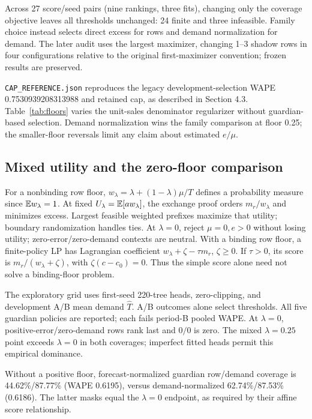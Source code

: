 Across 27 score/seed pairs (nine rankings, three fits), changing only the coverage objective leaves all thresholds unchanged: 24 finite and three infeasible. Family choice instead selects direct excess for rows and demand normalization for demand. The later audit uses the largest maximizer, changing 1--3 shadow rows in four configurations relative to the original first-maximizer convention; frozen results are preserved.

\texttt{CAP\_REFERENCE.json} reproduces the legacy development-selection WAPE 0.7530939208313988 and retained cap, as described in Section 4.3. Table~\ref{tab:floors} varies the unit-sales denominator regularizer without guardian-based selection. Demand normalization wins the family comparison at floor 0.25; the smaller-floor reversals limit any claim about estimated $e/\mu$.


\subsection{Mixed utility and the zero-floor comparison}
\label{app:mixed}
For a nonbinding row floor, $w_\lambda=\lambda+(1-\lambda)\mu/T$ defines a probability measure since $\mathbb{E} w_\lambda=1$. At fixed $U_\lambda=\mathbb{E}[aw_\lambda]$, the exchange proof orders $m_r/w_\lambda$ and minimizes excess. Largest feasible weighted prefixes maximize that utility; boundary randomization handles ties. At $\lambda=0$, reject $\mu=0,e>0$ without losing utility; zero-error/zero-demand contexts are neutral. With a binding row floor, a finite-policy LP has Lagrangian coefficient $w_\lambda+\zeta-\tau m_r$, $\zeta\geq0$. If $\tau>0$, its score is $m_r/(w_\lambda+\zeta)$, with $\zeta(c-c_0)=0$. Thus the simple score alone need not solve a binding-floor problem.

The exploratory grid uses first-seed 220-tree heads, zero-clipping, and development A/B mean demand $\hat T$. A/B outcomes alone select thresholds. All five guardian policies are reported; each fails period-B pooled WAPE. At $\lambda=0$, positive-error/zero-demand rows rank last and $0/0$ is zero. The mixed $\lambda=0.25$ point exceeds $\lambda=0$ in both coverages; imperfect fitted heads permit this empirical dominance.


Without a positive floor, forecast-normalized guardian row/demand coverage is 44.62\%/87.77\% (WAPE 0.6195), versus demand-normalized 62.74\%/87.53\% (0.6186). The latter masks equal the $\lambda=0$ endpoint, as required by their affine score relationship.

